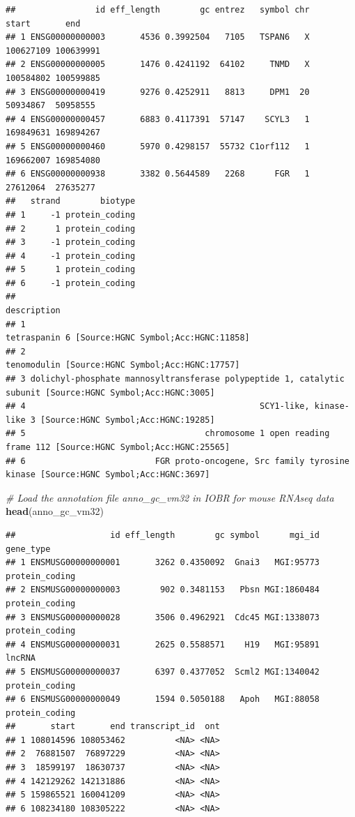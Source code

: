 \documentclass[
  12pt,
]{book}
\newenvironment{Shaded}{\begin{snugshade}}{\end{snugshade}}
\newcommand{\CommentTok}[1]{\textcolor[rgb]{0.56,0.35,0.01}{\textit{#1}}}
\newcommand{\FunctionTok}[1]{\textcolor[rgb]{0.13,0.29,0.53}{\textbf{#1}}}
\newcommand{\NormalTok}[1]{#1}
\begin{document}
\begin{verbatim}
##                id eff_length        gc entrez   symbol chr     start       end
## 1 ENSG00000000003       4536 0.3992504   7105   TSPAN6   X 100627109 100639991
## 2 ENSG00000000005       1476 0.4241192  64102     TNMD   X 100584802 100599885
## 3 ENSG00000000419       9276 0.4252911   8813     DPM1  20  50934867  50958555
## 4 ENSG00000000457       6883 0.4117391  57147    SCYL3   1 169849631 169894267
## 5 ENSG00000000460       5970 0.4298157  55732 C1orf112   1 169662007 169854080
## 6 ENSG00000000938       3382 0.5644589   2268      FGR   1  27612064  27635277
##   strand        biotype
## 1     -1 protein_coding
## 2      1 protein_coding
## 3     -1 protein_coding
## 4     -1 protein_coding
## 5      1 protein_coding
## 6     -1 protein_coding
##                                                                                                  description
## 1                                                          tetraspanin 6 [Source:HGNC Symbol;Acc:HGNC:11858]
## 2                                                            tenomodulin [Source:HGNC Symbol;Acc:HGNC:17757]
## 3 dolichyl-phosphate mannosyltransferase polypeptide 1, catalytic subunit [Source:HGNC Symbol;Acc:HGNC:3005]
## 4                                               SCY1-like, kinase-like 3 [Source:HGNC Symbol;Acc:HGNC:19285]
## 5                                    chromosome 1 open reading frame 112 [Source:HGNC Symbol;Acc:HGNC:25565]
## 6                          FGR proto-oncogene, Src family tyrosine kinase [Source:HGNC Symbol;Acc:HGNC:3697]
\end{verbatim}

\begin{Shaded}
\begin{Highlighting}[]
\CommentTok{\# Load the annotation file \textasciigrave{}anno\_gc\_vm32\textasciigrave{} in IOBR for mouse RNAseq data}
\FunctionTok{head}\NormalTok{(anno\_gc\_vm32)}
\end{Highlighting}
\end{Shaded}

\begin{verbatim}
##                   id eff_length        gc symbol      mgi_id      gene_type
## 1 ENSMUSG00000000001       3262 0.4350092  Gnai3   MGI:95773 protein_coding
## 2 ENSMUSG00000000003        902 0.3481153   Pbsn MGI:1860484 protein_coding
## 3 ENSMUSG00000000028       3506 0.4962921  Cdc45 MGI:1338073 protein_coding
## 4 ENSMUSG00000000031       2625 0.5588571    H19   MGI:95891         lncRNA
## 5 ENSMUSG00000000037       6397 0.4377052  Scml2 MGI:1340042 protein_coding
## 6 ENSMUSG00000000049       1594 0.5050188   Apoh   MGI:88058 protein_coding
##       start       end transcript_id  ont
## 1 108014596 108053462          <NA> <NA>
## 2  76881507  76897229          <NA> <NA>
## 3  18599197  18630737          <NA> <NA>
## 4 142129262 142131886          <NA> <NA>
## 5 159865521 160041209          <NA> <NA>
## 6 108234180 108305222          <NA> <NA>
\end{verbatim}
\end{document}
